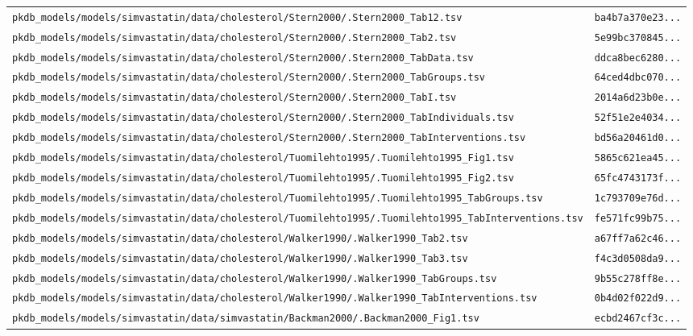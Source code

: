 \documentclass{article}
\begin{document}
\begin{longtable}{ll}
\texttt{pkdb\_models/models/simvastatin/data/cholesterol/Stern2000/.Stern2000\_Tab12.tsv} & \texttt{ba4b7a370e23...} \\
\texttt{pkdb\_models/models/simvastatin/data/cholesterol/Stern2000/.Stern2000\_Tab2.tsv} & \texttt{5e99bc370845...} \\
\texttt{pkdb\_models/models/simvastatin/data/cholesterol/Stern2000/.Stern2000\_TabData.tsv} & \texttt{ddca8bec6280...} \\
\texttt{pkdb\_models/models/simvastatin/data/cholesterol/Stern2000/.Stern2000\_TabGroups.tsv} & \texttt{64ced4dbc070...} \\
\texttt{pkdb\_models/models/simvastatin/data/cholesterol/Stern2000/.Stern2000\_TabI.tsv} & \texttt{2014a6d23b0e...} \\
\texttt{pkdb\_models/models/simvastatin/data/cholesterol/Stern2000/.Stern2000\_TabIndividuals.tsv} & \texttt{52f51e2e4034...} \\
\texttt{pkdb\_models/models/simvastatin/data/cholesterol/Stern2000/.Stern2000\_TabInterventions.tsv} & \texttt{bd56a20461d0...} \\
\texttt{pkdb\_models/models/simvastatin/data/cholesterol/Tuomilehto1995/.Tuomilehto1995\_Fig1.tsv} & \texttt{5865c621ea45...} \\
\texttt{pkdb\_models/models/simvastatin/data/cholesterol/Tuomilehto1995/.Tuomilehto1995\_Fig2.tsv} & \texttt{65fc4743173f...} \\
\texttt{pkdb\_models/models/simvastatin/data/cholesterol/Tuomilehto1995/.Tuomilehto1995\_TabGroups.tsv} & \texttt{1c793709e76d...} \\
\texttt{pkdb\_models/models/simvastatin/data/cholesterol/Tuomilehto1995/.Tuomilehto1995\_TabInterventions.tsv} & \texttt{fe571fc99b75...} \\
\texttt{pkdb\_models/models/simvastatin/data/cholesterol/Walker1990/.Walker1990\_Tab2.tsv} & \texttt{a67ff7a62c46...} \\
\texttt{pkdb\_models/models/simvastatin/data/cholesterol/Walker1990/.Walker1990\_Tab3.tsv} & \texttt{f4c3d0508da9...} \\
\texttt{pkdb\_models/models/simvastatin/data/cholesterol/Walker1990/.Walker1990\_TabGroups.tsv} & \texttt{9b55c278ff8e...} \\
\texttt{pkdb\_models/models/simvastatin/data/cholesterol/Walker1990/.Walker1990\_TabInterventions.tsv} & \texttt{0b4d02f022d9...} \\
\texttt{pkdb\_models/models/simvastatin/data/simvastatin/Backman2000/.Backman2000\_Fig1.tsv} & \texttt{ecbd2467cf3c...} \\

\end{longtable}
\end{document}

